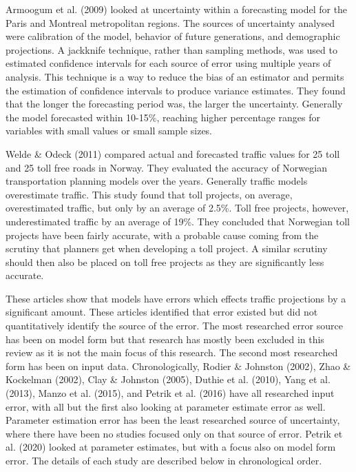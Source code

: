 \documentclass[fancy, masters]{byuthesis}
\begin{document}
Armoogum et al. (2009) looked at uncertainty within a forecasting model for the Paris and Montreal metropolitan regions. The sources of uncertainty analysed were calibration of the model, behavior of future generations, and demographic projections. A jackknife technique, rather than sampling methods, was used to estimated confidence intervals for each source of error using multiple years of analysis. This technique is a way to reduce the bias of an estimator and permits the estimation of confidence intervals to produce variance estimates. They found that the longer the forecasting period was, the larger the uncertainty. Generally the model forecasted within 10-15\%, reaching higher percentage ranges for variables with small values or small sample sizes.

Welde \& Odeck (2011) compared actual and forecasted traffic values for 25 toll and 25 toll free roads in Norway. They evaluated the accuracy of Norwegian transportation planning models over the years. Generally traffic models overestimate traffic. This study found that toll projects, on average, overestimated traffic, but only by an average of 2.5\%. Toll free projects, however, underestimated traffic by an average of 19\%. They concluded that Norwegian toll projects have been fairly accurate, with a probable cause coming from the scrutiny that planners get when developing a toll project. A similar scrutiny should then also be placed on toll free projects as they are significantly less accurate.

These articles show that models have errors which effects traffic projections by a significant amount. These articles identified that error existed but did not quantitatively identify the source of the error. The most researched error source has been on model form but that research has mostly been excluded in this review as it is not the main focus of this research. The second most researched form has been on input data. Chronologically, Rodier \& Johnston (2002), Zhao \& Kockelman (2002), Clay \& Johnston (2005), Duthie et al. (2010), Yang et al. (2013), Manzo et al. (2015), and Petrik et al. (2016) have all researched input error, with all but the first also looking at parameter estimate error as well. Parameter estimation error has been the least researched source of uncertainty, where there have been no studies focused only on that source of error. Petrik et al. (2020) looked at parameter estimates, but with a focus also on model form error. The details of each study are described below in chronological order.
\end{document}

